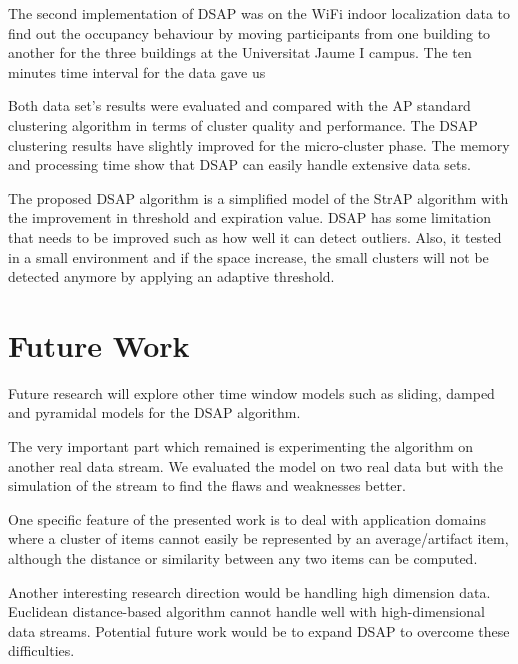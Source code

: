 The second implementation of DSAP was on the WiFi indoor localization data to find out the occupancy behaviour by moving participants from one building to another for the three buildings at the Universitat Jaume I campus. The ten minutes time interval for the data gave us 

Both data set's results were evaluated and compared with the AP standard clustering algorithm in terms of cluster quality and performance. The DSAP clustering results have slightly improved for the micro-cluster phase. The memory and processing time show that DSAP can easily handle extensive data sets. 


The proposed DSAP algorithm is a simplified model of the StrAP algorithm with the improvement in threshold and expiration value. DSAP has some limitation that needs to be improved such as how well it can detect outliers. Also, it tested in a small environment and if the space increase, the small clusters will not be detected anymore by applying an adaptive threshold.   


\section{Future Work}

Future research will explore other time window models such as sliding, damped and pyramidal models for the DSAP algorithm.  

The very important part which remained is experimenting the algorithm on another real data stream. We evaluated the model on two real data but with the simulation of the stream to find the flaws and weaknesses better.

One specific feature of the presented work is to deal with application domains where a cluster of items cannot easily be represented by an average/artifact item, although the distance or similarity between any two items can be computed. 

Another interesting research direction would be handling high dimension data. Euclidean distance-based algorithm cannot handle well with high-dimensional data streams. Potential future work would be to expand DSAP to overcome these difficulties.






